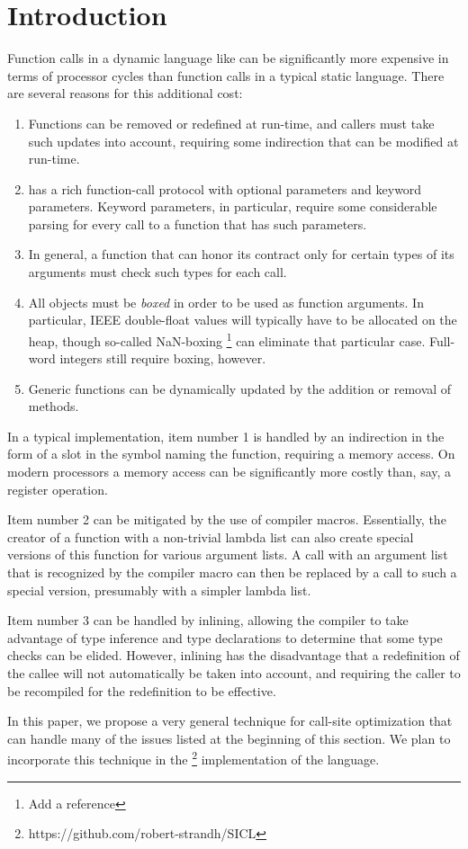 \section{Introduction}
\label{sec-introduction}

Function calls in a dynamic language like \commonlisp{} can be
significantly more expensive in terms of processor cycles than
function calls in a typical static language.  There are several
reasons for this additional cost:

\begin{enumerate}
\item Functions can be removed or redefined at run-time, and callers
  must take such updates into account, requiring some indirection that
  can be modified at run-time.
\item \commonlisp{} has a rich function-call protocol with optional
  parameters and keyword parameters.  Keyword parameters, in
  particular, require some considerable parsing for every
  call to a function that has such parameters.
\item In general, a function that can honor its contract only for
  certain types of its arguments must check such types for each call.
\item All objects must be \emph{boxed} in order to be used as function
  arguments.  In particular, IEEE double-float values will typically
  have to be allocated on the heap, though so-called NaN-boxing%
  \footnote{Add a reference} can
  eliminate that particular case.  Full-word integers still require
  boxing, however.
\item Generic functions can be dynamically updated by the addition or
  removal of methods.
\end{enumerate}

In a typical \commonlisp{} implementation, item number 1 is handled by
an indirection in the form of a slot in the symbol naming the
function, requiring a memory access.  On modern processors a memory
access can be significantly more costly than, say, a register
operation.

Item number 2 can be mitigated by the use of compiler macros.
Essentially, the creator of a function with a non-trivial lambda list
can also create special versions of this function for various argument
lists.  A call with an argument list that is recognized by the
compiler macro can then be replaced by a call to such a special
version, presumably with a simpler lambda list.

Item number 3 can be handled by inlining, allowing the compiler to
take advantage of type inference and type declarations to determine
that some type checks can be elided.  However, inlining has the
disadvantage that a redefinition of the callee will not automatically
be taken into account, and requiring the caller to be recompiled for
the redefinition to be effective.

In this paper, we propose a very general technique for call-site
optimization that can handle many of the issues listed at the
beginning of this section.  We plan to incorporate this technique in
the \sicl{}%
\footnote{https://github.com/robert-strandh/SICL}
implementation of the \commonlisp{} language.

